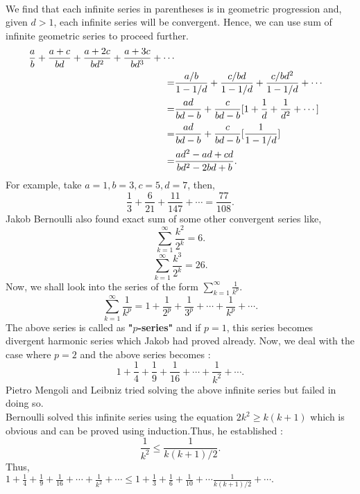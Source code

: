 \documentclass[a4paper,reqno,11pt]{amsart}
\theoremstyle{plain}%
\begin{document}
  \\
We find that each infinite series in parentheses is in geometric progression and, given $d > 1$, each infinite series will be convergent. Hence, we can use sum of infinite geometric series to proceed further.\\
\begin{align*}
\frac{a}{b} + \frac{a+c}{bd} + \frac{a+2c}{bd^2} + \frac{a+3c}{bd^3} + \cdots\\
\indent =& \frac{a/b}{1-1/d} + \frac{c/bd}{1-1/d} + \frac{c/bd^2}{1-1/d} + \cdots\\
\indent =& \frac{ad}{bd-b} + \frac{c}{bd-b}[1 + \frac{1}{d} + \frac{1}{d^2} + \cdots] \\
\indent =& \frac{ad}{bd-b} + \frac{c}{bd-b}[\frac{1}{1-1/d}] \\
\indent =& \frac{ad^2 - ad + cd}{bd^2 - 2bd + b}.\\
\end{align*}
For example, take $a = 1, b = 3, c = 5, d = 7$, then,\\
$$\frac{1}{3} + \frac{6}{21} + \frac{11}{147} + \cdots = \frac{77}{108}.$$
Jakob Bernoulli also found exact sum of some other convergent series like,\\
$$\sum_{k=1}^{\infty}\frac{k^2}{2^k} = 6.$$
$$\sum_{k=1}^{\infty}\frac{k^3}{2^k} = 26.$$
Now, we shall look into the series of the form $\sum_{k=1}^{\infty}\frac{1}{k^p}$.\\
$$\sum_{k=1}^{\infty}\frac{1}{k^p} = 1 + \frac{1}{2^{p}} + \frac{1}{3^p} + \cdots + \frac{1}{k^p} + \cdots.$$
The above series is called as \textbf{"$p$-series"} and if $p=1$, this series becomes divergent harmonic series which Jakob had proved already. Now, we deal with the case where $p=2$ and the above series becomes :\\
$$ 1 + \frac{1}{4} + \frac{1}{9} + \frac{1}{16} + \cdots + \frac{1}{k^2} + \cdots .$$
Pietro Mengoli and Leibniz tried solving the above infinite series but failed in doing so.\\
Bernoulli solved this infinite series using the equation $2k^2 \geq k(k+1)$ which is obvious and can be proved using induction.Thus, he established :\\
$$ \frac{1}{k^2} \leq \frac{1}{k(k+1)/2}. $$
Thus,\\
$ 1 + \frac{1}{4} + \frac{1}{9} + \frac{1}{16} + \cdots + \frac{1}{k^2} + \cdots \leq 1 + \frac{1}{3} + \frac{1}{6} + \frac{1}{10} + \cdots \frac{1}{k(k+1)/2} + \cdots.$\\
\\
\end{document}
